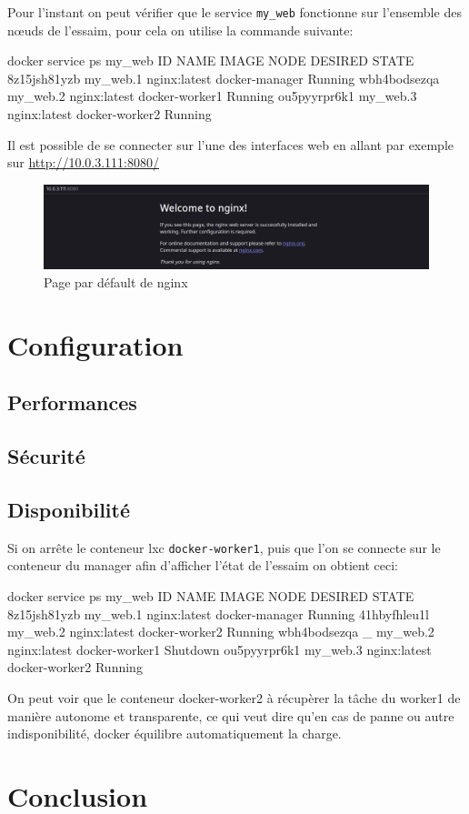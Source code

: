 Pour l'instant on peut vérifier que le service \verb:my_web: fonctionne sur l'ensemble des
nœuds de l'essaim, pour cela on utilise la commande suivante:
\begin{bash}
docker service ps my_web
ID           NAME     IMAGE        NODE           DESIRED STATE
8z15jsh81yzb my_web.1 nginx:latest docker-manager Running      
wbh4bodsezqa my_web.2 nginx:latest docker-worker1 Running      
ou5pyyrpr6k1 my_web.3 nginx:latest docker-worker2 Running       
\end{bash}
\newpage

Il est possible de se connecter sur l'une des interfaces web en allant par exemple sur 
\url{http://10.0.3.111:8080/}

\begin{figure}[h!]
    \centering
    \includegraphics[width=\textwidth]{img/nginx}
    \caption{Page par défault de nginx}
\end{figure}

\chapter{Configuration}

\section{Performances}

\section{Sécurité}

\section{Disponibilité}
Si on arrête le conteneur lxc \verb:docker-worker1:, puis que l'on se connecte sur le
conteneur du manager afin d'afficher l'état de l'essaim on obtient ceci:
\begin{bash}
docker service ps my_web
ID           NAME         IMAGE        NODE           DESIRED STATE   
8z15jsh81yzb my_web.1     nginx:latest docker-manager Running         
41hbyfhleu1l my_web.2     nginx:latest docker-worker2 Running        
wbh4bodsezqa  \_ my_web.2 nginx:latest docker-worker1 Shutdown      
ou5pyyrpr6k1 my_web.3     nginx:latest docker-worker2 Running      
\end{bash}
On peut voir que le conteneur docker-worker2 à récupèrer la tâche du worker1 de manière
autonome et transparente, ce qui veut dire qu'en cas de panne ou autre indisponibilité, 
docker équilibre automatiquement la charge.


\chapter{Conclusion}
